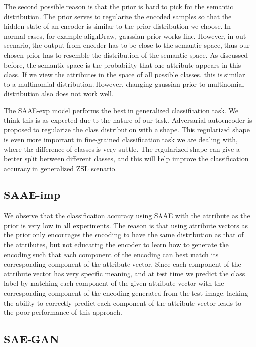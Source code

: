 \documentclass{article}
\begin{document}
The second possible reason is that the prior is hard to pick for the semantic distribution. The prior serves to regularize the encoded samples so that the hidden state of an encoder is similar to the prior distribution we choose. In normal cases, for example alignDraw\cite{mansimov2015generating}, gaussian prior works fine. However, in out scenario, the output from encoder has to be close to the semantic space, thus our chosen prior has to resemble the distribution of the semantic space. As discussed before, the semantic space is the probability that one attribute appears in this class. If we view the attributes in the space of all possible classes, this is similar to a multinomial distribution. However, changing gaussian prior to multinomial distribution also does not work well. 

The SAAE-exp model performs the best in generalized classification task. We think this is as expected due to the nature of our task. Adversarial autoencoder is proposed to regularize the class distribution with a shape. This regularized shape is even more important in fine-grained classification task we are dealing with, where the difference of classes is very subtle. The regularized shape can give a better split between different classes, and this will help improve the classification accuracy in generalized ZSL scenario.

\subsection{SAAE-imp}

We observe that the classification accuracy using SAAE with the attribute as the prior is very low in all experiments. The reason is that using attribute vectors as the prior only encourages the encoding to have the same distribution as that of the attributes, but not educating the encoder to learn how to generate the encoding such that each component of the encoding can best match its corresponding component of the attribute vector. Since each component of the attribute vector has very specific meaning, and at test time we predict the class label by matching each component of the given attribute vector with the corresponding component of the encoding generated from the test image, lacking the ability to correctly predict each component of the attribute vector leads to the poor performance of this approach.


\subsection{SAE-GAN}
\end{document}
